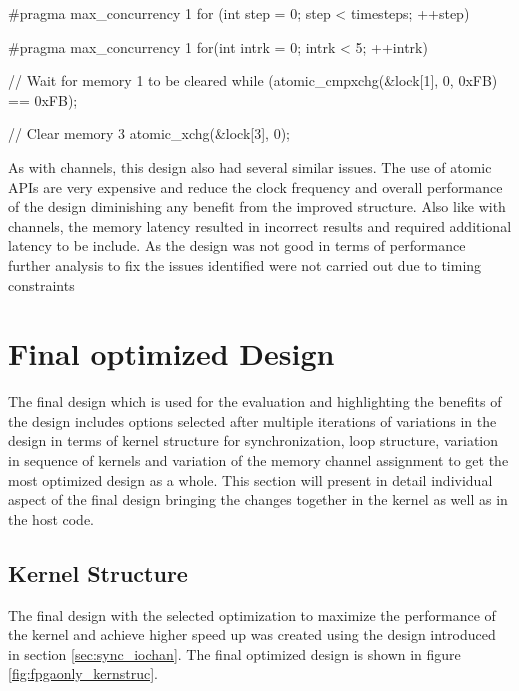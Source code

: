 \begin{CppCode}[caption=Synchronization Implementation with atomic functions, frame=tlrb, label=code:atomic_impl]
#pragma max_concurrency 1
for (int step = 0; step < timesteps; ++step)
{
    #pragma max_concurrency 1
    for(int intrk = 0; intrk < 5; ++intrk)
    {
        // Wait for memory 1 to be cleared
        while (atomic_cmpxchg(&lock[1], 0, 0xFB) == 0xFB);

        // Clear memory 3
        atomic_xchg(&lock[3], 0);
    }
}
\end{CppCode}

As with channels, this design also had several similar issues. The use of atomic APIs are very expensive and
reduce the clock frequency and overall performance of the design diminishing any benefit from the improved
structure. Also like with channels, the memory latency resulted in incorrect results and required additional
latency to be include. As the design was not good in terms of performance further analysis to fix the issues
identified were not carried out due to timing constraints

\section{Final optimized Design}
\label{sec:final_struc}

The final design which is used for the evaluation and highlighting the benefits of the design includes
options selected after multiple iterations of variations in the design in terms of kernel
structure for synchronization, loop structure, variation in sequence of kernels and variation
of the memory channel assignment to get the most optimized design as a whole. This section
will present in detail individual aspect of the final design bringing the changes together
in the kernel as well as in the host code.

\subsection{Kernel Structure}

The final design with the selected optimization to maximize the performance of the kernel and achieve
higher speed up was created using the design introduced in section \ref{sec:sync_iochan}.
The final optimized design is shown in figure \ref{fig:fpgaonly_kernstruc}.

